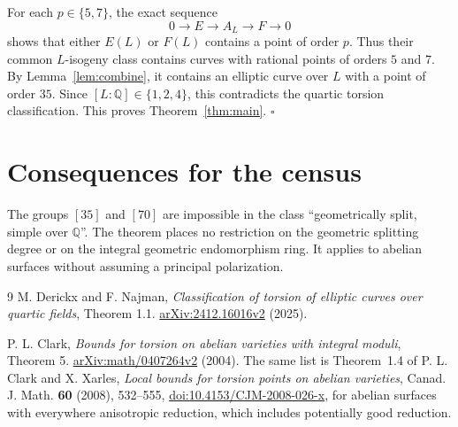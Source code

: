 \documentclass[11pt]{article}
\newcommand{\Q}{\mathbb Q}
\begin{document}
For each \(p\in\{5,7\}\), the exact sequence
\[
 0\longrightarrow E\longrightarrow A_L\longrightarrow F
 \longrightarrow0
\]
shows that either \(E(L)\) or \(F(L)\) contains a point of order
\(p\). Thus their common \(L\)-isogeny class contains curves with
rational points of orders \(5\) and \(7\).
By Lemma~\ref{lem:combine}, it contains an elliptic curve over
\(L\) with a point of order \(35\).
Since \([L:\Q]\in\{1,2,4\}\), this contradicts the quartic
torsion classification. This proves Theorem~\ref{thm:main}.
\hfill\(\square\)

\section{Consequences for the census}

The groups
\href{https://genus-2-torsion.github.io/group.html?g=35}{\([35]\)}
and
\href{https://genus-2-torsion.github.io/group.html?g=70}{\([70]\)}
are impossible in the class ``geometrically split, simple over
\(\Q\)''. The theorem places no restriction on the geometric
splitting degree or on the integral geometric endomorphism ring.
It applies to abelian surfaces without assuming a principal
polarization.

\begin{thebibliography}{9}
M. Derickx and F. Najman,
\emph{Classification of torsion of elliptic curves over quartic
fields}, Theorem 1.1.
\href{https://arxiv.org/html/2412.16016v2}{arXiv:2412.16016v2} (2025).

P. L. Clark,
\emph{Bounds for torsion on abelian varieties with integral moduli},
Theorem 5.
\href{https://arxiv.org/pdf/math/0407264}{arXiv:math/0407264v2} (2004).
The same list is Theorem~1.4 of P. L. Clark and X. Xarles, \emph{Local bounds for torsion points on abelian varieties}, Canad. J. Math. \textbf{60} (2008), 532--555, \href{https://doi.org/10.4153/CJM-2008-026-x}{doi:10.4153/CJM-2008-026-x}, for abelian surfaces with everywhere anisotropic reduction, which includes potentially good reduction.
\end{thebibliography}
\end{document}

